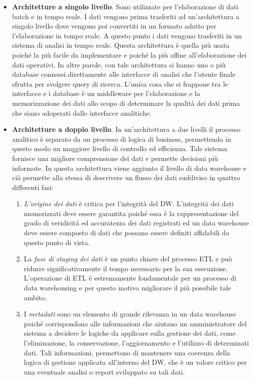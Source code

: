 \begin{itemize}
    \item \textbf{Architetture a singolo livello}. Sono utilizzate per l’elaborazione di dati batch e in tempo reale. I dati vengono prima trasferiti ad un’architettura a singolo livello dove vengono poi convertiti in un formato adatto per l’elaborazione in tempo reale. A questo punto i dati vengono trasferiti in un sistema di analisi in tempo reale. Questa architettura è quella più usata poiché la più facile da implementare e poiché la più affine all'elaborazione dei dati operativi. In altre parole, con tale architettura si hanno uno o più database connessi direttamente alle interfacce di analisi che l’utente finale sfrutta per svolgere query di ricerca. L’unica cosa che si frappone tra le interfacce e i database è un middleware per l’elaborazione e la memorizzazione dei dati allo scopo di determinare la qualità dei dati prima che siano adoperati dalle interfacce analitiche.
    \item \textbf{Architetture a doppio livello}. In un’architettura a due livelli il processo analitico è separato da un processo di logica di business, permettendo in questo modo un maggiore livello di controllo ed efficienza. Tale sistema fornisce una migliore comprensione dei dati e permette decisioni più informate. In questa architettura viene aggiunto il livello di data warehouse e ciò permette alla stessa di descrivere un flusso dei dati suddiviso in quattro differenti fasi:
        \begin{enumerate}
            \item \textit{L’origine dei dati} è critica per l’integrità del DW. L’integrità dei dati memorizzati deve essere garantita poiché essa è la rappresentazione del grado di veridicità ed accuratezza dei dati registrati ed un data warehouse deve essere composto di dati che possano essere definiti affidabili da questo punto di vista.
            \item La \textit{fase di staging dei dati} è un punto chiave del processo ETL e può ridurre significativamente il tempo necessario per la sua esecuzione. L’operazione di ETL è estremamente fondamentale per un processo di data warehousing e per questo motivo migliorare il più possibile tale ambito.
            \item I \textit{metadati} sono un elemento di grande rilevanza in un data warehouse poiché corrispondono alle informazioni che aiutano un amministratore del sistema a decidere le logiche da applicare sulla gestione dei dati, come l’eliminazione, la conservazione, l’aggiornamento e l’utilizzo di determinati dati. Tali informazioni, permettono di mantenere una coerenza della logica di gestione applicata all'interno del DW, che è un valore critico per una eventuale analisi o report sviluppato su tali dati.

\end{enumerate}
\end{itemize}
